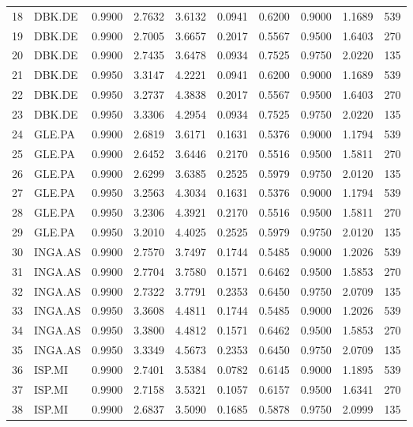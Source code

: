 \begin{table}
\begin{tabular}{llrrrrrrrr}
18 & DBK.DE & 0.9900 & 2.7632 & 3.6132 & 0.0941 & 0.6200 & 0.9000 & 1.1689 & 539 \\
19 & DBK.DE & 0.9900 & 2.7005 & 3.6657 & 0.2017 & 0.5567 & 0.9500 & 1.6403 & 270 \\
20 & DBK.DE & 0.9900 & 2.7435 & 3.6478 & 0.0934 & 0.7525 & 0.9750 & 2.0220 & 135 \\
21 & DBK.DE & 0.9950 & 3.3147 & 4.2221 & 0.0941 & 0.6200 & 0.9000 & 1.1689 & 539 \\
22 & DBK.DE & 0.9950 & 3.2737 & 4.3838 & 0.2017 & 0.5567 & 0.9500 & 1.6403 & 270 \\
23 & DBK.DE & 0.9950 & 3.3306 & 4.2954 & 0.0934 & 0.7525 & 0.9750 & 2.0220 & 135 \\
24 & GLE.PA & 0.9900 & 2.6819 & 3.6171 & 0.1631 & 0.5376 & 0.9000 & 1.1794 & 539 \\
25 & GLE.PA & 0.9900 & 2.6452 & 3.6446 & 0.2170 & 0.5516 & 0.9500 & 1.5811 & 270 \\
26 & GLE.PA & 0.9900 & 2.6299 & 3.6385 & 0.2525 & 0.5979 & 0.9750 & 2.0120 & 135 \\
27 & GLE.PA & 0.9950 & 3.2563 & 4.3034 & 0.1631 & 0.5376 & 0.9000 & 1.1794 & 539 \\
28 & GLE.PA & 0.9950 & 3.2306 & 4.3921 & 0.2170 & 0.5516 & 0.9500 & 1.5811 & 270 \\
29 & GLE.PA & 0.9950 & 3.2010 & 4.4025 & 0.2525 & 0.5979 & 0.9750 & 2.0120 & 135 \\
30 & INGA.AS & 0.9900 & 2.7570 & 3.7497 & 0.1744 & 0.5485 & 0.9000 & 1.2026 & 539 \\
31 & INGA.AS & 0.9900 & 2.7704 & 3.7580 & 0.1571 & 0.6462 & 0.9500 & 1.5853 & 270 \\
32 & INGA.AS & 0.9900 & 2.7322 & 3.7791 & 0.2353 & 0.6450 & 0.9750 & 2.0709 & 135 \\
33 & INGA.AS & 0.9950 & 3.3608 & 4.4811 & 0.1744 & 0.5485 & 0.9000 & 1.2026 & 539 \\
34 & INGA.AS & 0.9950 & 3.3800 & 4.4812 & 0.1571 & 0.6462 & 0.9500 & 1.5853 & 270 \\
35 & INGA.AS & 0.9950 & 3.3349 & 4.5673 & 0.2353 & 0.6450 & 0.9750 & 2.0709 & 135 \\
36 & ISP.MI & 0.9900 & 2.7401 & 3.5384 & 0.0782 & 0.6145 & 0.9000 & 1.1895 & 539 \\
37 & ISP.MI & 0.9900 & 2.7158 & 3.5321 & 0.1057 & 0.6157 & 0.9500 & 1.6341 & 270 \\
38 & ISP.MI & 0.9900 & 2.6837 & 3.5090 & 0.1685 & 0.5878 & 0.9750 & 2.0999 & 135 \\

\end{tabular}
\end{table}
